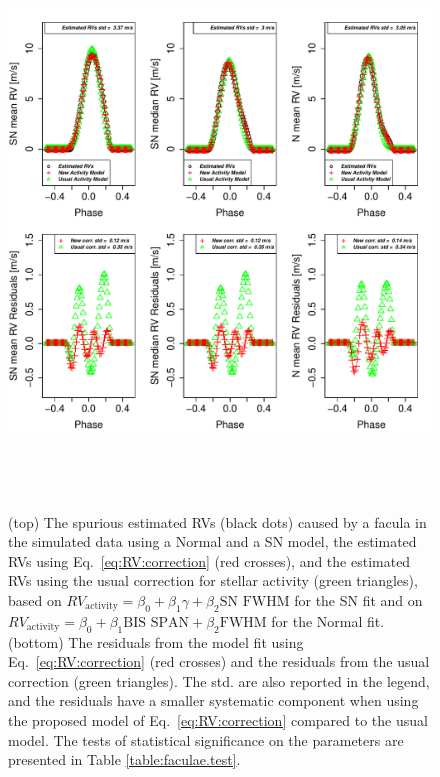 \documentclass{aa}
\begin{document}
\begin{figure}[htbp]
\begin{center}
\includegraphics[height = 6in]{FACULAE_NEW_CORRECTION_[3]CorrectionActivity_RadialVelocity_vs_time.pdf} 
   \caption{(top) The spurious estimated RVs (black dots) caused by a facula in the simulated data using a Normal and a SN model, the estimated RVs using Eq.~\eqref{eq:RV:correction} (red crosses), and the estimated RVs using the usual correction for stellar activity (green triangles), based on $RV_{\text{activity}}=\beta_0+\beta_1 \gamma + \beta_2 \text{SN FWHM}$ for the SN fit and on $RV_{\text{activity}}=\beta_0+\beta_1 \text{BIS SPAN} + \beta_2 \text{FWHM}$ for the Normal fit.    
 (bottom) The residuals from the model fit using Eq.~\eqref{eq:RV:correction} (red crosses) and the residuals from the usual correction (green triangles). The std. are also reported in the legend, and the residuals have a smaller systematic component when using the proposed model of Eq.~\eqref{eq:RV:correction} compared to the usual model.
The tests of statistical significance on the parameters are presented in Table \ref{table:faculae.test}.
}\label{fig:faculae.correction}
\end{center}
\end{figure}
\end{document}
